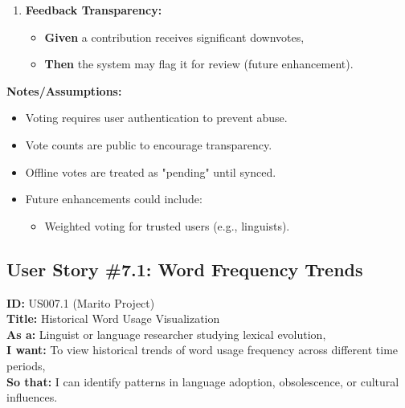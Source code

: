 \documentclass[12pt]{article}
\begin{document}
\begin{enumerate}
    \item \textbf{Feedback Transparency:}
    \begin{itemize}
        \item \textbf{Given} a contribution receives significant downvotes,
        \item \textbf{Then} the system may flag it for review (future enhancement).
    \end{itemize}
\end{enumerate}

\vspace{1em}
\textbf{Notes/Assumptions:}
\begin{itemize}
    \item Voting requires user authentication to prevent abuse.
    \item Vote counts are public to encourage transparency.
    \item Offline votes are treated as "pending" until synced.
    \item Future enhancements could include:
    \begin{itemize}
        \item Weighted voting for trusted users (e.g., linguists).
    \end{itemize}
\end{itemize}


\subsection{User Story \#7.1: Word Frequency Trends}

\textbf{ID:} US007.1 (Marito Project) \\
\textbf{Title:} Historical Word Usage Visualization \\
\textbf{As a:} Linguist or language researcher studying lexical evolution, \\
\textbf{I want:} To view historical trends of word usage frequency across different time periods, \\
\textbf{So that:} I can identify patterns in language adoption, obsolescence, or cultural influences.
\end{document}
